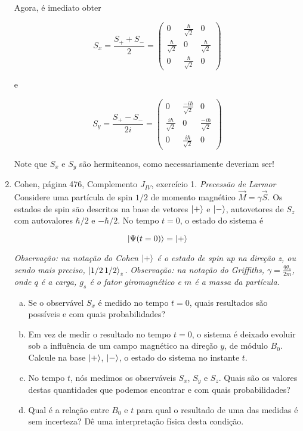 \documentclass[a4paper, 12pt, notitlepage]{article}
\begin{document}
\begin{enumerate}
Agora, é imediato obter

\[
S_x = \frac{S_+ + S_-}{2} = \begin{pmatrix}
  0 & \frac{\hbar}{\sqrt{2}} & 0 \\
  \frac{\hbar}{\sqrt{2}} & 0 & \frac{\hbar}{\sqrt{2}} \\
  0 & \frac{\hbar}{\sqrt{2}} & 0
\end{pmatrix}
\]

\noindent e

\[
S_y = \frac{S_+ - S_-}{2i} = \begin{pmatrix}
  0 & \frac{-i\hbar}{\sqrt{2}} & 0 \\
  \frac{i\hbar}{\sqrt{2}} & 0 & \frac{-i\hbar}{\sqrt{2}} \\
  0 & \frac{i\hbar}{\sqrt{2}} & 0
\end{pmatrix}
\]

Note que $S_x$ e $S_y$ são hermiteanos, como necessariamente deveriam ser!


\item Cohen, página 476, Complemento $J_{IV}$, exercício 1.\newline
\textit{Precessão de Larmor}\newline
Considere uma partícula de spin $1/2$ de momento magnético $\vec{M} = \gamma \vec{S}$. Os estados de spin são descritos na base de vetores $\ket{+}$ e $\ket{-}$, autovetores de $S_z$ com autovalores $\hbar/2$ e $-\hbar/2$. No tempo $t=0$, o estado do sistema é

\begin{equation}
  \ket{\Psi(t=0)} = \ket{+}
\label{eq:psi.t0}
\end{equation}

\textit{Observação: na notação do Cohen $\ket{+}$ é o estado de spin up na direção z, ou sendo mais preciso, $\ket{1/2\,1/2}_z$.}\newline
\textit{Observação: na notação do Griffiths, $\gamma = \frac{qg_s}{2m}$, onde $q$ é a carga, $g_s$ é o fator giromagnético e $m$ é a massa da partícula.}

\begin{enumerate}[(a)]
 \item Se o observável $S_x$ é medido no tempo $t=0$, quais resultados são possíveis e com quais probabilidades?
 \item Em vez de medir o resultado no tempo $t=0$, o sistema é deixado evoluir sob a influência de um campo magnético na direção $y$, de módulo $B_0$. Calcule na base $\ket{+}$, $\ket{-}$, o estado do sistema no instante $t$.
 \item No tempo $t$, nós medimos os observáveis $S_x$, $S_y$ e $S_z$. Quais são os valores destas quantidades que podemos encontrar e com quais probabilidades?
 \item Qual é a relação entre $B_0$ e $t$ para qual o resultado de uma das medidas é sem incerteza? Dê uma interpretação física desta condição.
\end{enumerate}


\end{enumerate}
\end{document}

